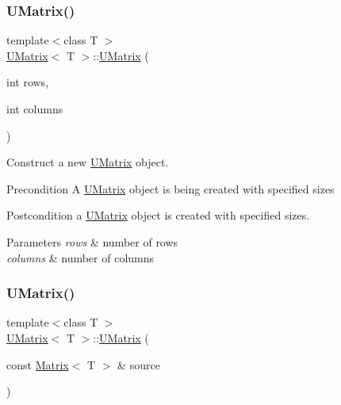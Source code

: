 \subsubsection{\texorpdfstring{UMatrix()}{UMatrix()}\hspace{0.1cm}{\footnotesize\ttfamily [2/4]}}
{\footnotesize\ttfamily template$<$class T $>$ \\
\mbox{\hyperlink{class_u_matrix}{U\+Matrix}}$<$ T $>$\+::\mbox{\hyperlink{class_u_matrix}{U\+Matrix}} (\begin{DoxyParamCaption}\item[{int}]{rows,  }\item[{int}]{columns }\end{DoxyParamCaption})}



Construct a new \mbox{\hyperlink{class_u_matrix}{U\+Matrix}} object. 

\begin{DoxyPrecond}{Precondition}
A \mbox{\hyperlink{class_u_matrix}{U\+Matrix}} object is being created with specified sizes 
\end{DoxyPrecond}
\begin{DoxyPostcond}{Postcondition}
a \mbox{\hyperlink{class_u_matrix}{U\+Matrix}} object is created with specified sizes.
\end{DoxyPostcond}

\begin{DoxyParams}{Parameters}
{\em rows} & number of rows \\
\hline
{\em columns} & number of columns \\
\hline
\end{DoxyParams}
\mbox{\label{class_u_matrix_a784cebb7d674ada97720bcb34f49ca6b}} 
\subsubsection{\texorpdfstring{UMatrix()}{UMatrix()}\hspace{0.1cm}{\footnotesize\ttfamily [3/4]}}
{\footnotesize\ttfamily template$<$class T $>$ \\
\mbox{\hyperlink{class_u_matrix}{U\+Matrix}}$<$ T $>$\+::\mbox{\hyperlink{class_u_matrix}{U\+Matrix}} (\begin{DoxyParamCaption}\item[{const \mbox{\hyperlink{class_matrix}{Matrix}}$<$ T $>$ \&}]{source }\end{DoxyParamCaption})}



